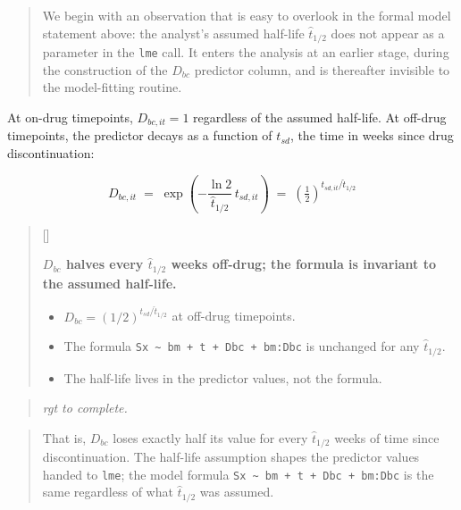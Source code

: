 \documentclass[
  11pt,
]{article}
\newcounter{pgraph}
\newenvironment{bullets}{%
  \stepcounter{pgraph}%
  \begin{quote}\small\sffamily\color[gray]{0.30}%
  {\normalfont\scriptsize\color[gray]{0.58}[\thepgraph]\enspace}}{%
  \end{quote}}
\newenvironment{rgt}{%
  \begin{quote}\small\itshape\color[RGB]{20,60,160}}{%
  \end{quote}}
\newenvironment{orig}{%
  \begin{quote}\normalsize\color[gray]{0.55}}{%
  \end{quote}}
\begin{document}
\begin{orig}
We begin with an observation that is easy to overlook in the
formal model statement above: the analyst's assumed half-life
\(\hat{t}_{1/2}\) does not appear as a parameter in the \texttt{lme}
call. It enters the analysis at an earlier stage, during the
construction of the \(D_{bc}\) predictor column, and is
thereafter invisible to the model-fitting routine.

\end{orig}

At on-drug timepoints, \(D_{bc,it} = 1\) regardless of the assumed
half-life. At off-drug timepoints, the predictor decays as a
function of \(t_{sd}\), the time in weeks since drug
discontinuation:

\[
D_{bc,it} \;=\; \exp\!\left(-\frac{\ln 2}{\hat{t}_{1/2}}
  \, t_{sd,it}\right)
  \;=\; \left(\tfrac{1}{2}\right)^{t_{sd,it}/\hat{t}_{1/2}}
\]

\begin{bullets}

\textbf{$D_{bc}$ halves every $\hat{t}_{1/2}$ weeks off-drug; the
formula is invariant to the assumed half-life.}

\begin{itemize}\setlength{\itemsep}{2pt}\setlength{\parskip}{0pt}
\item $D_{bc} = (1/2)^{t_{sd}/\hat{t}_{1/2}}$ at off-drug
timepoints.
\item The formula \texttt{Sx \textasciitilde{} bm + t + Dbc + bm:Dbc}
is unchanged for any $\hat{t}_{1/2}$.
\item The half-life lives in the predictor values, not the formula.
\end{itemize}

\end{bullets}

\begin{rgt}
rgt to complete.

\end{rgt}

\begin{orig}
That is, \(D_{bc}\) loses exactly half its value for every
\(\hat{t}_{1/2}\) weeks of time since discontinuation. The
half-life assumption shapes the predictor values handed to
\texttt{lme}; the model formula \texttt{Sx\ \textasciitilde{}\ bm\ +\ t\ +\ Dbc\ +\ bm:Dbc} is
the same regardless of what \(\hat{t}_{1/2}\) was assumed.

\end{orig}
\end{document}
